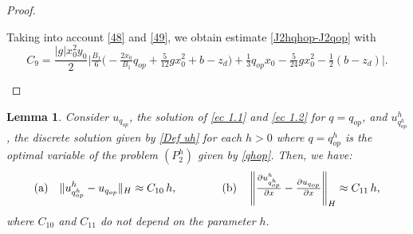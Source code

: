 \documentclass[11pt]{article}
\newcommand\pder[2][]{\ensuremath{\tfrac{\partial#1}{\partial#2}}}
\newtheorem{Lemma}{Lemma}
\begin{document}
\begin{proof}
\begin{itemize}

  
 \noindent Taking into account \eqref{48} and \eqref{49}, we obtain estimate \eqref{J2hqhop-J2qop}   with  $$C_9=\frac{|g| x_0^2 y_0 }{2} \Big\lvert\tfrac{B_1}{6}\Big(-\tfrac{2x_0}{B_1}q_{op}+\tfrac{5 }{12}g x_0^2 +b-z_d \Big)+ \tfrac{1}{3}q_{{op}} x_0 - \tfrac{5}{24} g x_0^2 - \tfrac{1}{2} (b-z_d)\Big\rvert. $$

  \end{itemize}
  \end{proof}

     
  
\begin{Lemma} Consider $u_{q_{op}}$, the solution of \eqref{ec 1.1} and \eqref{ec 1.2} for $q= q_{op}$, and ${u^h_{q^h_{op}}}$, 
 the discrete solution given by \eqref{Def uh} for each $h>0$ where $q={q^h_{op}}$ is the optimal variable of the problem ${(P^h_2)}$ given by \eqref{qhop}. Then, we have:
  \begin{equation}  \label{difu-problema2} {\rm (a)} \quad  			      
  				  \lVert {u^h_{q^h_{op}}}- u_{q_{op}}  \rVert _H \approx C_{10}\, h,
  \qquad \qquad
     {\rm (b)}\quad
        \left\lVert \pder[{u^h_{q^h_{op}}}]{x} - \pder[u_{q_{op}}]{x} \right\rVert _H \approx C_{11} \,h,
\end{equation}
 \noindent where $C_{10}$ and $C_{11}$ do not depend on the parameter $h.$
     
\end{Lemma}
   
   
   
\end{document}
